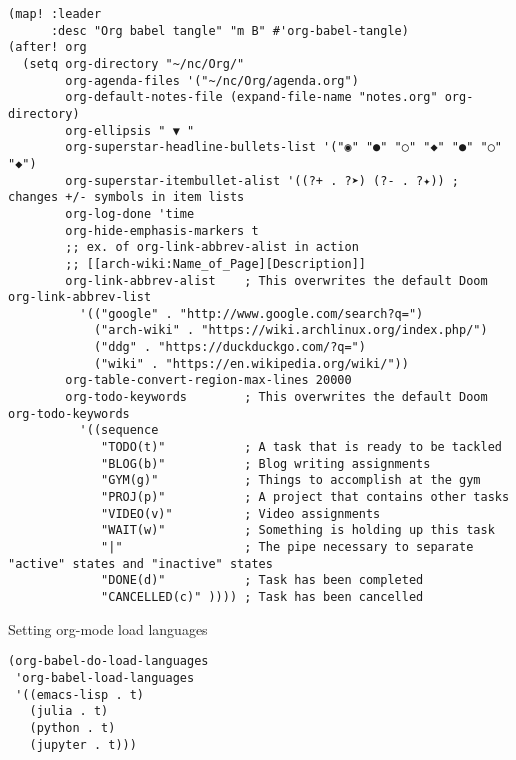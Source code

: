 \documentclass[11pt]{article}
\begin{document}
\begin{verbatim}
(map! :leader
      :desc "Org babel tangle" "m B" #'org-babel-tangle)
(after! org
  (setq org-directory "~/nc/Org/"
        org-agenda-files '("~/nc/Org/agenda.org")
        org-default-notes-file (expand-file-name "notes.org" org-directory)
        org-ellipsis " ▼ "
        org-superstar-headline-bullets-list '("◉" "●" "○" "◆" "●" "○" "◆")
        org-superstar-itembullet-alist '((?+ . ?➤) (?- . ?✦)) ; changes +/- symbols in item lists
        org-log-done 'time
        org-hide-emphasis-markers t
        ;; ex. of org-link-abbrev-alist in action
        ;; [[arch-wiki:Name_of_Page][Description]]
        org-link-abbrev-alist    ; This overwrites the default Doom org-link-abbrev-list
          '(("google" . "http://www.google.com/search?q=")
            ("arch-wiki" . "https://wiki.archlinux.org/index.php/")
            ("ddg" . "https://duckduckgo.com/?q=")
            ("wiki" . "https://en.wikipedia.org/wiki/"))
        org-table-convert-region-max-lines 20000
        org-todo-keywords        ; This overwrites the default Doom org-todo-keywords
          '((sequence
             "TODO(t)"           ; A task that is ready to be tackled
             "BLOG(b)"           ; Blog writing assignments
             "GYM(g)"            ; Things to accomplish at the gym
             "PROJ(p)"           ; A project that contains other tasks
             "VIDEO(v)"          ; Video assignments
             "WAIT(w)"           ; Something is holding up this task
             "|"                 ; The pipe necessary to separate "active" states and "inactive" states
             "DONE(d)"           ; Task has been completed
             "CANCELLED(c)" )))) ; Task has been cancelled
\end{verbatim}
Setting org-mode load languages
\begin{verbatim}
(org-babel-do-load-languages
 'org-babel-load-languages
 '((emacs-lisp . t)
   (julia . t)
   (python . t)
   (jupyter . t)))
\end{verbatim}
\end{document}

